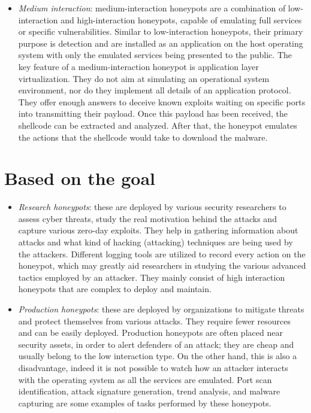 \documentclass[epsfig,a4paper,11pt,titlepage,oneside,openany]{book}
\begin{document}
\begin{itemize}
\begin{itemize}
\item \textit{Medium interaction}: medium-interaction honeypots are a combination of low-interaction and high-interaction honeypots, capable of emulating full services or specific vulnerabilities. Similar to low-interaction honeypots, their primary purpose is detection and are installed as an application on the host operating system with only the emulated services being presented to the public. The key feature of a medium-interaction honeypot is application layer virtualization. They do not aim at simulating an operational system environment, nor do they implement all details of an application protocol. They offer enough answers to deceive known exploits waiting on specific ports into transmitting their payload. Once this payload has been received, the shellcode can be extracted and analyzed. After that, the honeypot emulates the actions that the shellcode would take to download the malware.

\end{itemize}

\section{Based on the goal}

\begin{itemize}
\item \textit{Research honeypots}: these are deployed by various security researchers to assess cyber threats, study the real motivation behind the attacks and capture various zero-day exploits. They help in gathering information about attacks and what kind of hacking (attacking) techniques are being used by the attackers. Different logging tools are utilized to record every action on the honeypot, which may greatly aid researchers in studying the various advanced tactics employed by an attacker. They mainly consist of high interaction honeypots that are complex to deploy and maintain.


\item \textit{Production honeypots}: these are deployed by organizations to mitigate threats and protect themselves from various attacks. They require fewer resources and can be easily deployed. Production honeypots are often placed near security assets, in order to alert defenders of an attack; they are cheap and usually belong to the low interaction type. On the other hand, this is also a disadvantage, indeed it is not possible to watch how an attacker interacts with the operating system as all the services are emulated. Port scan identification, attack signature generation, trend analysis, and malware capturing are some examples of tasks performed by these honeypots.



\end{itemize}
\end{itemize}
\end{document}
